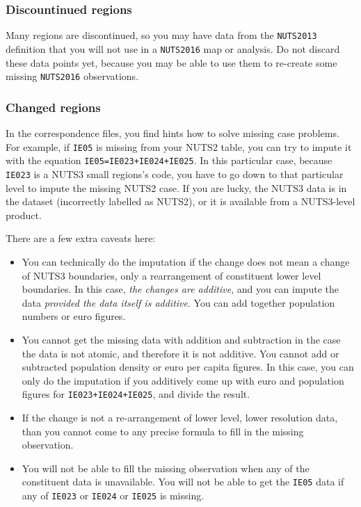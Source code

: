 \documentclass[]{article}
\begin{document}
\hypertarget{discountinued-regions}{%
\subsubsection{Discountinued regions}\label{discountinued-regions}}

Many regions are discontinued, so you may have data from the
\texttt{NUTS2013} definition that you will not use in a
\texttt{NUTS2016} map or analysis. Do not discard these data points yet,
because you may be able to use them to re-create some missing
\texttt{NUTS2016} observations.

\hypertarget{changed-regions}{%
\subsubsection{Changed regions}\label{changed-regions}}

In the correspondence files, you find hints how to solve missing case
problems. For example, if \texttt{IE05} is missing from your NUTS2
table, you can try to impute it with the equation
\texttt{IE05=IE023+IE024+IE025}. In this particular case, because
\texttt{IE023} is a NUTS3 small regions's code, you have to go down to
that particular level to impute the missing NUTS2 case. If you are
lucky, the NUTS3 data is in the dataset (incorrectly labelled as NUTS2),
or it is available from a NUTS3-level product.

There are a few extra caveats here:

\begin{itemize}
\item
  You can technically do the imputation if the change does not mean a
  change of NUTS3 boundaries, only a rearrangement of constituent lower
  level boundaries. In this case, \emph{the changes are additive}, and
  you can impute the data \emph{provided the data itself is additive}.
  You can add together population numbers or euro figures.
\item
  You cannot get the missing data with addition and subtraction in the
  case the data is not atomic, and therefore it is not additive. You
  cannot add or subtracted population density or euro per capita
  figures. In this case, you can only do the imputation if you
  additively come up with euro and population figures for
  \texttt{IE023+IE024+IE025}, and divide the result.
\item
  If the change is not a re-arrangement of lower level, lower resolution
  data, than you cannot come to any precise formula to fill in the
  missing observation.
\item
  You will not be able to fill the missing observation when any of the
  constituent data is unavailable. You will not be able to get the
  \texttt{IE05} data if any of \texttt{IE023} or \texttt{IE024} or
  \texttt{IE025} is missing.
\end{itemize}
\end{document}
